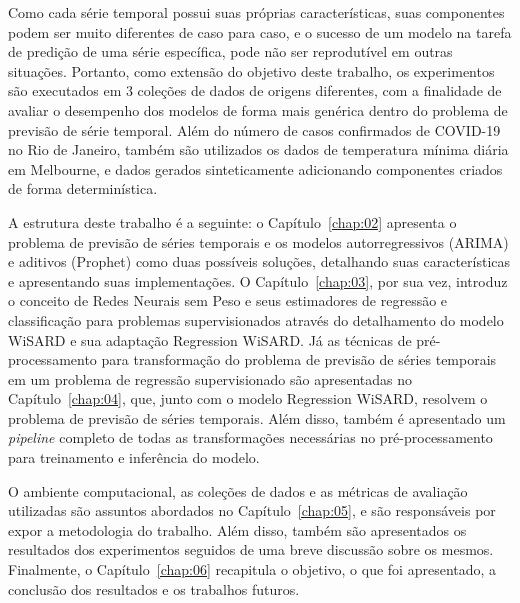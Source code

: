 Como cada série temporal possui suas próprias características, suas componentes podem ser muito diferentes de caso para caso, e o sucesso de um modelo na tarefa de predição de uma série específica, pode não ser reprodutível em outras situações. Portanto, como extensão do objetivo deste trabalho, os experimentos são executados em 3 coleções de dados de origens diferentes, com a finalidade de avaliar o desempenho dos modelos de forma mais genérica dentro do problema de previsão de série temporal. Além do número de casos confirmados de COVID-19 no Rio de Janeiro, também são utilizados os dados de temperatura mínima diária em Melbourne, e dados gerados sinteticamente adicionando componentes criados de forma determinística.

A estrutura deste trabalho é a seguinte: o Capítulo~\ref{chap:02} apresenta o problema de previsão de séries temporais e os modelos autorregressivos (ARIMA) e aditivos (Prophet) como duas possíveis soluções, detalhando suas características e apresentando suas implementações. O Capítulo~\ref{chap:03}, por sua vez, introduz o conceito de Redes Neurais sem Peso e seus estimadores de regressão e classificação para problemas supervisionados através do detalhamento do modelo WiSARD e sua adaptação Regression WiSARD. Já as técnicas de pré-processamento para transformação do problema de previsão de séries temporais em um problema de regressão supervisionado são apresentadas no Capítulo~\ref{chap:04}, que, junto com o modelo Regression WiSARD, resolvem o problema de previsão de séries temporais. Além disso, também é apresentado um \textit{pipeline} completo de todas as transformações necessárias no pré-processamento para treinamento e inferência do modelo.

O ambiente computacional, as coleções de dados e as métricas de avaliação utilizadas são assuntos abordados no Capítulo~\ref{chap:05}, e são responsáveis por expor a metodologia do trabalho. Além disso, também são apresentados os resultados dos experimentos seguidos de uma breve discussão sobre os mesmos. Finalmente, o Capítulo~\ref{chap:06} recapitula o objetivo, o que foi apresentado, a conclusão dos resultados e os trabalhos futuros.